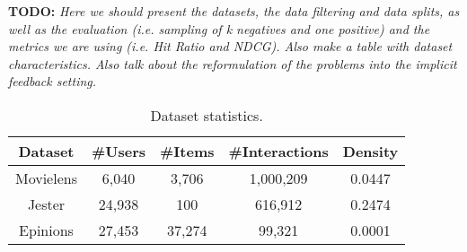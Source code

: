 \textbf{TODO: }
\textit{Here we should present the datasets, the data filtering and data splits, as well as the evaluation (i.e. sampling of k negatives and one positive) and the metrics we are using (i.e. Hit Ratio and NDCG). Also make a table with dataset characteristics. Also talk about the reformulation of the problems into the implicit feedback setting.}

\begin{table}[h]
    \centering
    \begin{tabular}{c|c|c|c|c}
        \hline
        Dataset & \#Users & \#Items & \#Interactions & Density \\
        \hline
        Movielens &  6,040 &  3,706 & 1,000,209 & 0.0447 \\
        Jester    & 24,938 &    100 &   616,912 & 0.2474 \\
        Epinions  & 27,453 & 37,274 &    99,321 & 0.0001
    \end{tabular}
    \caption{Dataset statistics.}
    \label{tab:datasets}
\end{table}
